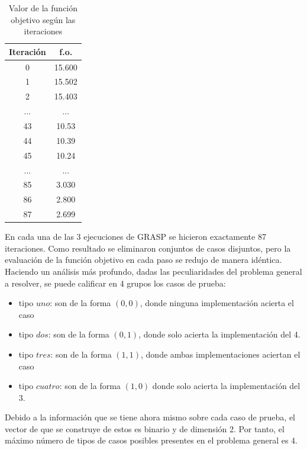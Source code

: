 \documentclass[a4paper,12pt]{book}
\begin{document}
	\begin{table}[h]
		\begin{center}
			\begin{tabular}{| c | c |} \hline
				Iteración & f.o. \\ \hline
				0 & 15.600 \\
				1 & 15.502 \\
				2 & 15.403 \\
				... & ... \\
				43 & 10.53 \\
				44 & 10.39 \\
				45 & 10.24 \\
				... & ... \\
				85 & 3.030 \\
				86 & 2.800 \\
				87 & 2.699 \\ \hline
			\end{tabular}
			\caption{Valor de la función objetivo según las iteraciones}
			\label{tab:foGRASP123}
		\end{center}
	\end{table}
		
	En cada una de las 3 ejecuciones de GRASP se hicieron exactamente 87 iteraciones. Como resultado se eliminaron conjuntos de casos disjuntos, pero la evaluación de la función objetivo en cada paso se redujo de manera idéntica. \\
	
	Haciendo un análisis más profundo, dadas las peculiaridades del problema general a resolver, se puede calificar en 4 grupos los casos de prueba:
	
	\begin{itemize}
		\item tipo $uno$: son de la forma $(0, 0)$, donde ninguna implementación acierta el caso
		\item tipo $dos$: son de la forma $(0, 1)$, donde solo acierta la implementación del 4.
		\item tipo $tres$: son de la forma $(1, 1)$, donde ambas implementaciones aciertan el caso
		\item tipo $cuatro$: son de la forma $(1, 0)$ donde solo acierta la implementación del 3.
	\end{itemize}

	Debido a la información que se tiene ahora mismo sobre cada caso de prueba, el vector de que se construye de estos es binario y de dimensión 2. Por tanto, el máximo número de tipos de casos posibles presentes en el problema general es 4.\\
\end{document}
